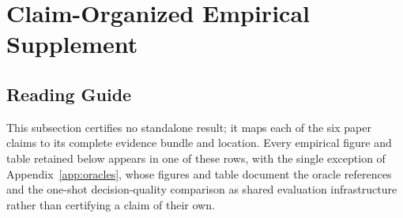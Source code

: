 \section{Claim-Organized Empirical Supplement}
\label{app:experiment-supplement}
\setcounter{subsection}{-1}

\subsection{Reading Guide}
\label{app:inventory}

This subsection certifies no standalone result; it maps each of the six paper claims to its complete evidence bundle and location. Every empirical figure and table retained below appears in one of these rows, with the single exception of Appendix~\ref{app:oracles}, whose figures and table document the oracle references and the one-shot decision-quality comparison as shared evaluation infrastructure rather than certifying a claim of their own.

